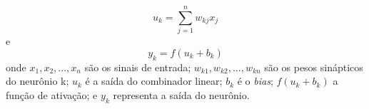 \begin{equation}
	u_{k} = \sum_{j=1}^{n} w_{kj} x_{j}
\end{equation}
e
\begin{equation}
	y_{k} = f(u_{k} + b_{k})	
\end{equation}
onde $ x_{1}, x_{2}, ..., x_{n} $ são os sinais de entrada; $ w_{k1}, w_{k2}, ..., w_{kn} $ são os pesos sinápticos do neurônio k; $ u_{k} $ é a saída do combinador linear; $ b_{k} $ é o \textit{bias}; $ f(u_{k} + b_{k}) $ a função de ativação; e $ y_{k} $ representa a saída do neurônio.


